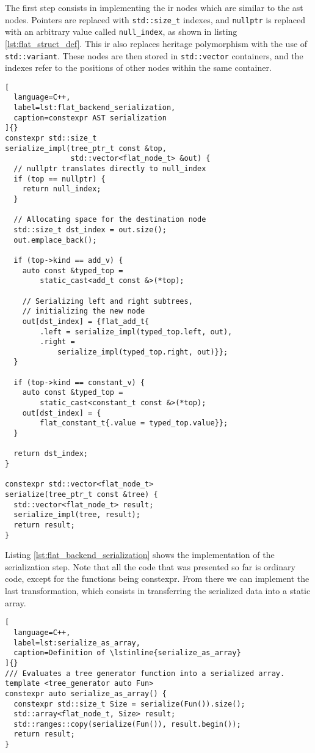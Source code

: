 \documentclass[../main]{subfiles}
\begin{document}
The first step consists in implementing the \gls{ir} nodes which are similar
to the \gls{ast} nodes.
Pointers are replaced with \lstinline{std::size_t} indexes,
and \lstinline{nullptr} is replaced with an arbitrary value called
\lstinline{null_index}, as shown in listing \ref{lst:flat_struct_def}.
This \gls{ir} also replaces heritage polymorphism with the use of
\lstinline{std::variant}.
These nodes are then stored in \lstinline{std::vector} containers,
and the indexes refer to the positions of other nodes within the same container.

\begin{lstlisting}[
  language=C++,
  label=lst:flat_backend_serialization,
  caption=constexpr AST serialization
]{}
constexpr std::size_t
serialize_impl(tree_ptr_t const &top,
               std::vector<flat_node_t> &out) {
  // nullptr translates directly to null_index
  if (top == nullptr) {
    return null_index;
  }

  // Allocating space for the destination node
  std::size_t dst_index = out.size();
  out.emplace_back();

  if (top->kind == add_v) {
    auto const &typed_top =
        static_cast<add_t const &>(*top);

    // Serializing left and right subtrees,
    // initializing the new node
    out[dst_index] = {flat_add_t{
        .left = serialize_impl(typed_top.left, out),
        .right =
            serialize_impl(typed_top.right, out)}};
  }

  if (top->kind == constant_v) {
    auto const &typed_top =
        static_cast<constant_t const &>(*top);
    out[dst_index] = {
        flat_constant_t{.value = typed_top.value}};
  }

  return dst_index;
}

constexpr std::vector<flat_node_t>
serialize(tree_ptr_t const &tree) {
  std::vector<flat_node_t> result;
  serialize_impl(tree, result);
  return result;
}
\end{lstlisting}

Listing \ref{lst:flat_backend_serialization} shows the implementation of the
serialization step. Note that all the code that was presented so far
is ordinary \cpp code, except for the functions being \gls{constexpr}.
From there we can implement the last transformation, which consists
in transferring the serialized data into a static array.

\begin{lstlisting}[
  language=C++,
  label=lst:serialize_as_array,
  caption=Definition of \lstinline{serialize_as_array}
]{}
/// Evaluates a tree generator function into a serialized array.
template <tree_generator auto Fun>
constexpr auto serialize_as_array() {
  constexpr std::size_t Size = serialize(Fun()).size();
  std::array<flat_node_t, Size> result;
  std::ranges::copy(serialize(Fun()), result.begin());
  return result;
}
\end{lstlisting}
\end{document}
